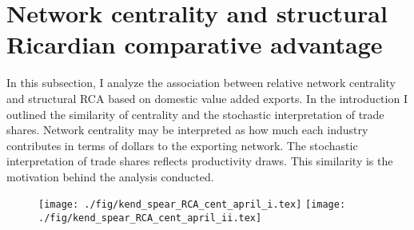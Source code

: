 \section{Network centrality and structural Ricardian comparative advantage}
In this subsection, I analyze the association between relative network centrality and  structural RCA based on domestic value added exports.
In the introduction I  outlined the similarity of centrality and the stochastic  interpretation of trade shares.
 Network centrality may be interpreted as how much each industry contributes in terms of dollars to the exporting network.
 The stochastic interpretation of trade  shares reflects productivity  draws.
 This similarity is the motivation behind the analysis conducted.     \par
 \begin{figure}[H]
  \centering
\texttt{[image: ./fig/kend\_spear\_RCA\_cent\_april\_i.tex]}
\texttt{[image: ./fig/kend\_spear\_RCA\_cent\_april\_ii.tex]}
\end{figure}
\endinput


